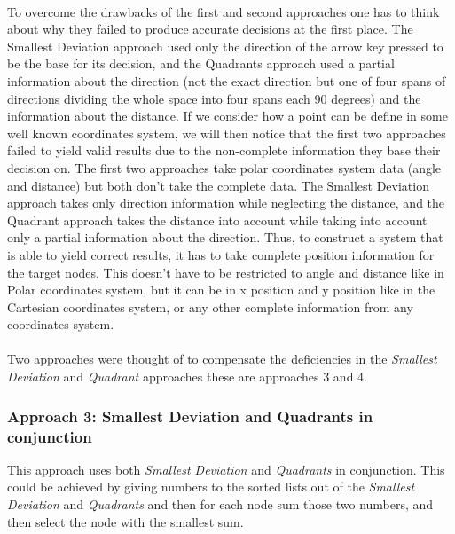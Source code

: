 \paragraph{}
To overcome the drawbacks of the first and second approaches one has to think about why they failed to produce accurate decisions at the first place. The Smallest Deviation approach used only the direction of the arrow key pressed to be the base for its decision, and the Quadrants approach used a partial information about the direction (not the exact direction but one of four spans of directions dividing the whole space into four spans each 90 degrees) and the information about the distance. If we consider how a point can be define in some well known coordinates system, we will then notice that the first two approaches failed to yield valid results due to the non-complete information they base their decision on. The first two approaches take polar coordinates system data (angle and distance) but both don't take the complete data. The Smallest Deviation approach takes only direction information while neglecting the distance, and the Quadrant approach takes the distance into account while taking into account only a partial information about the direction. Thus, to construct a system that is able to yield correct results, it has to take complete position information for the target nodes. This doesn't have to be restricted to angle and distance like in Polar coordinates system, but it can be in x position and y position like in the Cartesian coordinates system, or any other complete information from any coordinates system.

\paragraph{}
Two approaches were thought of to compensate the deficiencies in the {\it Smallest Deviation} and {\it Quadrant} approaches these are approaches 3 and 4.

\subsubsection{Approach 3: Smallest Deviation and Quadrants in conjunction}
This approach uses both {\it Smallest Deviation} and {\it Quadrants} in conjunction. This could be achieved by giving numbers to the sorted lists out of the {\it Smallest Deviation} and  {\it Quadrants} and then for each node sum those two numbers, and then select the node with the smallest sum.

